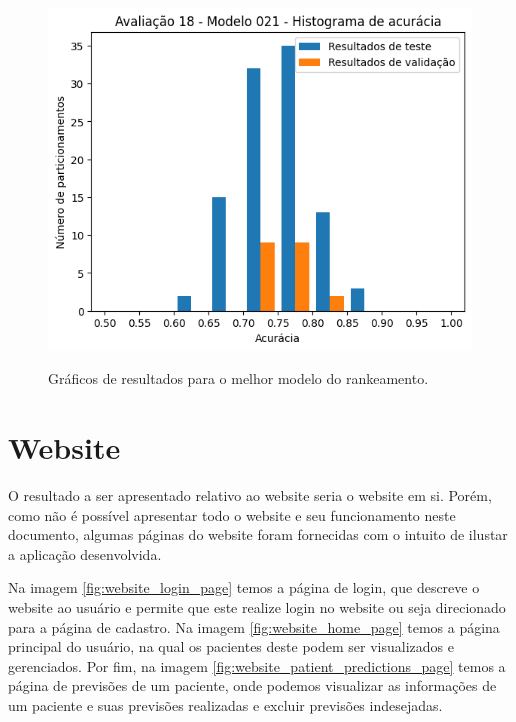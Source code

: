 \begin{figure}[h]
{    \includegraphics[scale=0.5]{images/histograma_resultados_melhor_modelo.png}
    \label{fig:best_results_histogram}
  }
	\caption{Gráficos de resultados para o melhor modelo do rankeamento.}
	\label{fig:best_results_plot}
\end{figure}

\section{Website}

O resultado a ser apresentado relativo ao website seria o website em si. Porém, como não é possível apresentar todo o website e seu funcionamento neste documento, algumas páginas do website foram fornecidas com o intuito de ilustar a aplicação desenvolvida.

Na imagem \ref{fig:website_login_page} temos a página de login, que descreve o website ao usuário e permite que este realize login no website ou seja direcionado para a página de cadastro. Na imagem \ref{fig:website_home_page} temos a página principal do usuário, na qual os pacientes deste podem ser visualizados e gerenciados. Por fim, na imagem \ref{fig:website_patient_predictions_page} temos a página de previsões de um paciente, onde podemos visualizar as informações de um paciente e suas previsões realizadas e excluir previsões indesejadas.

